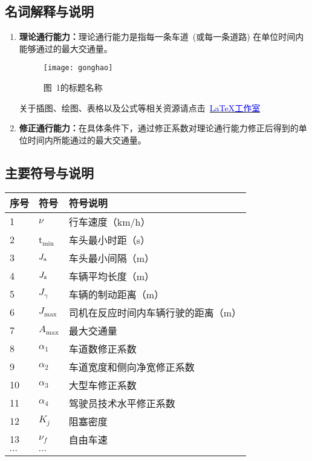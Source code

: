 \documentclass[12pt,a4paper]{mcmthesis}
\newcommand\wordc[1]{\textbf{#1}}
\newcommand{\headcol}{\rowcolor{tableheadcolor}}
\begin{document}
\subsection{名词解释与说明}
\begin{enumerate}
\item \wordc{理论通行能力：}理论通行能力是指每一条车道~(或每一条道路) 在单位时间内
能够通过的最大交通量。

\begin{figure}[h!t]
\centerline{\texttt{[image: gonghao]}\quad
}
\vspace{-4em}
\caption{\song\wuhao
图~1的标题名称}
\end{figure}

关于插图、绘图、表格以及公式等相关资源请点击~\href{http://www.latexstudio.net}{\textcolor{blue}{\LaTeX{}工作室}}

\item \wordc{修正通行能力：}在具体条件下，通过修正系数对理论通行能力修正后得到的单
位时间内所能通过的最大交通量。

\end{enumerate}
\subsection{主要符号与说明}

\begin{table}[h!]
  \centering
  \small
  \begin{tabular}{p{60pt}<{\centering}|p{60pt}<{\centering}p{180pt}<{\raggedright}}
   \hline
   \headcol 序号 & 符号 & 符号说明 \\
   \hline
    1 & $\nu$ & 行车速度（km/h） \\
    2 & t$_{\min}$ & 车头最小时距（s） \\
    3 & $J_{\rm a}$ & 车头最小间隔（m） \\
    4 & $J_{\rm z}$ & 车辆平均长度（m） \\
    5 & $J_{\gamma}$ & 车辆的制动距离（m） \\
    6 & $J_{\max}$ & 司机在反应时间内车辆行驶的距离（m） \\
    7 & $A_{\max}$ & 最大交通量 \\
    8 & $\alpha_{1}$ & 车道数修正系数 \\
    9 & $\alpha_{2}$ & 车道宽度和侧向净宽修正系数 \\
    10 & $\alpha_{3}$ & 大型车修正系数 \\
    11 & $\alpha_{4}$ & 驾驶员技术水平修正系数 \\
    12 & $K_{j}$ & 阻塞密度 \\
    13 & $\nu_{f}$ & 自由车速 \\
    $\cdots$ & $\cdots$\\
    \hline
  \end{tabular}
  \label{symbol}
\end{table}
\end{document}
